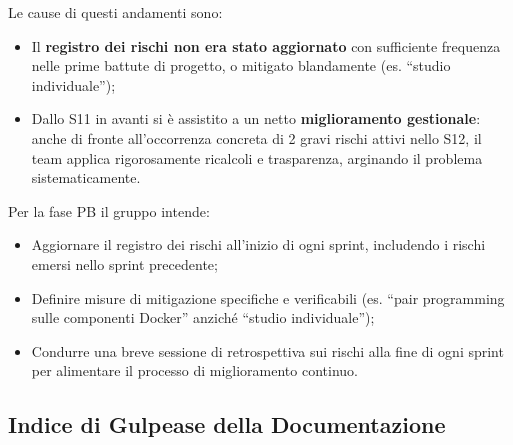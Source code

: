 \documentclass[a4paper,11pt,oneside]{scrartcl}
\begin{document}
Le cause di questi andamenti sono:
\begin{itemize}
    \item Il \textbf{registro dei rischi non era stato aggiornato} con sufficiente frequenza nelle prime battute di progetto, o mitigato blandamente (es. ``studio individuale'');
    \item Dallo S11 in avanti si è assistito a un netto \textbf{miglioramento gestionale}: anche di fronte all'occorrenza concreta di 2 gravi rischi attivi nello S12, il team applica rigorosamente ricalcoli e trasparenza, arginando il problema sistematicamente.
\end{itemize}

Per la fase PB il gruppo intende:
\begin{itemize}
    \item Aggiornare il registro dei rischi all'inizio di ogni sprint, includendo i rischi emersi nello sprint precedente;
    \item Definire misure di mitigazione specifiche e verificabili (es. ``pair programming sulle componenti Docker'' anziché ``studio individuale'');
    \item Condurre una breve sessione di retrospettiva sui rischi alla fine di ogni sprint per alimentare il processo di miglioramento continuo.
\end{itemize}

\subsection{Indice di Gulpease della Documentazione}
\end{document}
